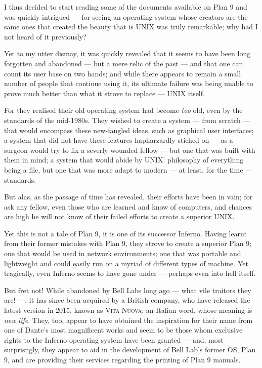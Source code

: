 \documentclass[a5paper,twoside,12pt]{report}
\begin{document}
I thus decided to start reading some of the documents available on Plan 9 and was quickly intrigued — for seeing an operating system whose creators are the same ones that created the beauty that is UNIX was truly remarkable; why had I not heard of it previously?

Yet to my utter dismay, it was quickly revealed that it seems to have been long forgotten and abandoned — but a mere relic of the past — and that one can count its user base on two hands; and while there appears to remain a small number of people that continue using it, its ultimate failure was being unable to prove much better than what it strove to replace — UNIX itself.

For they realised their old operating system had become \textit{too} old, even by the standards of the mid-1980s. They wished to create a system — from scratch — that would encompass these new-fangled ideas, such as graphical user interfaces; a system that did not have these features hapharzardly stiched on — as a surgeon would try to fix a severly wounded fellow — but one that was built with them in mind; a system that would abide by UNIX' philosophy of everything being a file, but one that was more adapt to modern — at least, for the time — standards.

But alas, as the passage of time has revealed, their efforts have been in vain; for ask any fellow, even those who are learned and know of computers, and chances are high he will not know of their failed efforts to create a superior UNIX.

Yet this is not a tale of Plan 9, it is one of its successor Inferno. Having learnt from their former mistakes with Plan 9, they strove to create a superior Plan 9; one that would be used in network environments; one that was portable and lightweight and could easily run on a myriad of different types of machine.
Yet tragically, even Inferno seems to have gone under — perhaps even into hell itself.

But fret not! While abandoned by Bell Labs long ago — what vile traitors they are! —, it has since been acquired by a British company, who have released the latest version in 2015, known as \textsc{Vita Nuova}; an Italian word, whose meaning is \textit{new life}. They, too, appear to have obtained the inspiration for their name from one of Dante's most magnificent works and seem to be those whom exclusive rights to the Inferno operating system have been granted — and, most surprisngly, they appear to aid in the development of Bell Lab's former OS, Plan 9, and are providing their services regarding the printing of Plan 9 manuals.
\end{document}
